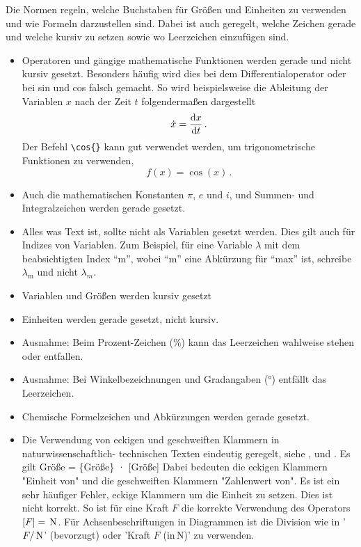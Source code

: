 Die Normen \cite{ISOnormunits}\cite{DINGroessen}\cite{DINFormelsatz}\cite{DINGroessen} 
regeln, welche Buchstaben für Größen und Einheiten zu verwenden und wie Formeln darzustellen sind. Dabei ist auch geregelt, welche Zeichen gerade und welche kursiv zu setzen sowie wo Leerzeichen einzufügen
sind.

\begin{itemize}

\item Operatoren und gängige mathematische Funktionen werden gerade und nicht kursiv gesetzt. Besonders häufig wird dies bei dem Differentialoperator oder bei sin und cos falsch gemacht. So wird beispielsweise die Ableitung der Variablen $x$ nach der Zeit $t$ folgendermaßen dargestellt \begin{equation}
\dot{x}=\frac{\mathrm{d} x}{\mathrm{d} t} \, .
\label{eq:derivative}
\end{equation}
Der Befehl \texttt{\textbackslash cos\{\}} kann gut verwendet werden, um trigonometrische Funktionen zu verwenden,
\begin{equation}
    f(x) = \cos{(x)}\,.
\end{equation}

\item Auch die mathematischen Konstanten $\pi$, $e$ und $i$, und Summen- und Integralzeichen werden gerade gesetzt.

\item Alles was Text ist, sollte nicht als Variablen gesetzt werden. Dies gilt auch für Indizes von Variablen. Zum Beispiel, für eine Variable $\lambda$ mit dem beabsichtigten Index ``m'', wobei ``m'' eine Abkürzung für ``max'' ist, schreibe $\lambda_{\mathrm{m}}$ und nicht $\lambda_m$.

\item Variablen und Größen werden kursiv gesetzt
\item Einheiten werden gerade gesetzt, nicht kursiv.

\item Ausnahme: Beim Prozent-Zeichen (\%) kann das Leerzeichen wahlweise stehen oder entfallen.
\item Ausnahme: Bei Winkelbezeichnungen und Gradangaben (°) entfällt das Leerzeichen.
\item Chemische Formelzeichen und Abkürzungen werden gerade gesetzt.

\item Die Verwendung von eckigen und geschweiften Klammern in naturwissenschaftlich- technischen  Texten eindeutig geregelt, siehe  \cite{ISOnormunits}, \cite{DINFormelsatz} \cite{SIbrochure2006}  und \cite{DINFormelzeichen}. Es gilt Größe = \{Größe\} · [Größe]
Dabei bedeuten die eckigen Klammern "Einheit von" und die geschweiften Klammern
"Zahlenwert von". Es ist ein sehr häufiger Fehler, eckige Klammern um die Einheit zu setzen. Dies ist nicht korrekt. So ist für eine Kraft $F$ die korrekte Verwendung des Operators $[F]=\,{\textnormal{N}}$. Für Achsenbeschriftungen in Diagrammen ist die Division wie in '$F/\,{\textnormal{N}}$' (bevorzugt) oder 'Kraft $F$ (in\,{N})' zu verwenden. 


\end{itemize}
